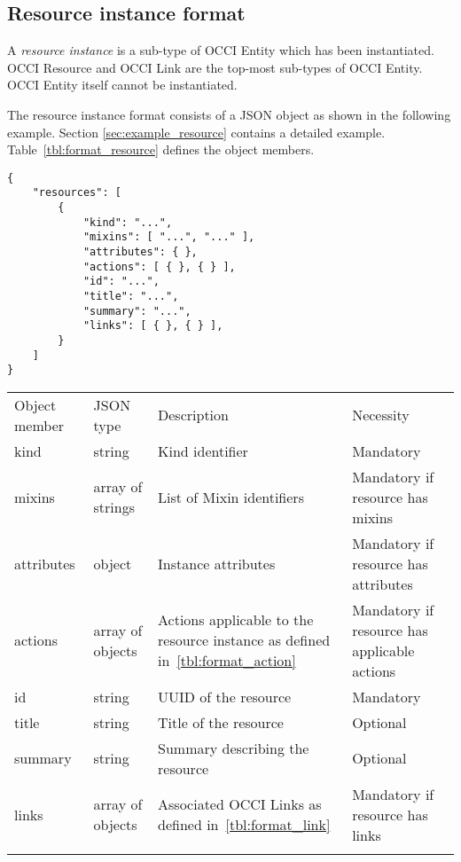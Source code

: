 \documentclass[10pt,a4paper]{article}
\begin{document}

\subsection{Resource instance format}
\label{sec:format_resource}

A {\em resource instance} is a sub-type of OCCI Entity which has been instantiated.
OCCI Resource and OCCI Link are the top-most sub-types of OCCI Entity.
OCCI Entity itself cannot be instantiated.

The resource instance format consists of a JSON object as shown in the
following example. Section \ref{sec:example_resource} contains a detailed example.
Table~\ref{tbl:format_resource} defines the object members.
\begin{verbatim}
{
    "resources": [
        {
            "kind": "...",
            "mixins": [ "...", "..." ],
            "attributes": { },
            "actions": [ { }, { } ],
            "id": "...",
            "title": "...",
            "summary": "...",
            "links": [ { }, { } ],
        }
    ]
}
\end{verbatim}
 {
    \begin{tabular}{llp{5.0cm}p{3.0cm}}
    \toprule
    Object member & JSON type & Description & Necessity \\
    \colrule
    kind & string & Kind identifier & Mandatory \\

    mixins & array of strings & List of Mixin identifiers &
    Mandatory if resource has mixins \\

    attributes & object & Instance attributes & Mandatory if resource has attributes \\

    actions & array of objects & Actions applicable to the resource instance as defined in~\ref{tbl:format_action} &
    Mandatory if resource has applicable actions \\
    
    id & string & UUID of the resource & Mandatory\\
        
    title & string & Title of the resource & Optional\\
    
    summary & string & Summary describing the resource & Optional\\
    
    links & array of objects & Associated OCCI Links as defined in~\ref{tbl:format_link} &
    Mandatory if resource has links\\
    \botrule
    \end{tabular}
}
\end{document}
